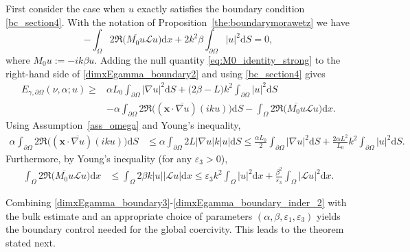 \documentclass[twoside,11pt]{article}
\def\dimx{\nu }
\def\d{{\mathrm d}}
\def\L{{\mathscr{L}}}
\renewcommand{\vec}[1]{\boldsymbol{#1}}
\def\L{{\mathscr{L}}}
\begin{document}
{{First consider the case when $u$ exactly satisfies the boundary condition \eqref{bc_section4}.}
With the notation of Proposition~\ref{the:boundarymorawetz} we have
\begin{equation}\label{eq:M0_identity_strong}
  - \int_\Omega 2 \Re \big(\overline{M_0 u} \L u\big) \d x
   +  2k^2\beta \int_{\partial\Omega} |u|^2 \d S  = 0,
\end{equation}
where $M_0 u := -ik\beta u$.
Adding the null quantity \eqref{eq:M0_identity_strong} to the right-hand side of \eqref{dimxEgamma_boundary2} and using \eqref{bc_section4} gives
\begin{align}\label{dimxEgamma_boundary3}
E_{\gamma,\partial \Omega}(\dimx,\alpha;u) 
    \ge & \alpha L_0 \int_{\partial \Omega} |\nabla u|^2  \d S
     +  \bigl(2\beta - L\bigr) k^2 \int_{\partial \Omega} |u|^2  \d S \nonumber\\
 & - 
    \alpha \int_{\partial \Omega}
      2 \Re \big((\vec{x}\cdot \overline{\nabla u}) (ik u)\big)  \d S
     -  \int_\Omega 2 \Re \big(\overline{M_0 u} \L u\big) \d x .
\end{align}
Using Assumption~\ref{ass_omega} and Young’s inequality,
\begin{equation}\label{dimxEgamma_boundary_inder_1}
\begin{aligned}
     \alpha \int_{\partial \Omega}
      2 \Re \big((\vec{x}\cdot \overline{\nabla u}) (ik u)\big)  \d S
      &\le \alpha \int_{\partial \Omega} 2L  |\nabla u|  k|u|  \d S
      \leq
      \frac{\alpha L_0}{2}\int_{\partial \Omega} |\nabla u|^2  \d S
       +  \frac{2\alpha L^2}{L_0} k^2 \int_{\partial \Omega} |u|^2  \d S .
\end{aligned}
\end{equation}
Furthermore, by Young’s inequality (for any $\varepsilon_3>0$),
\begin{equation}\label{dimxEgamma_boundary_inder_2}
\begin{aligned}
     \int_\Omega 2 \Re \big(\overline{M_0 u} \L u\big) \d x
      &\le \int_\Omega 2 \beta k  |u|  |\L u|  \d x 
      \le \varepsilon_3  k^2 \int_{\Omega} |u|^2  \d x
       +  \frac{\beta^2}{\varepsilon_3}\int_{\Omega} |\L u|^2  \d x .
\end{aligned}
\end{equation}

{Combining \eqref{dimxEgamma_boundary3}-\eqref{dimxEgamma_boundary_inder_2} with the bulk estimate and an appropriate choice of parameters $(\alpha,\beta,\varepsilon_1,\varepsilon_3)$ yields the boundary control needed for the global coercivity. This leads to the theorem stated next.}


}
\end{document}
